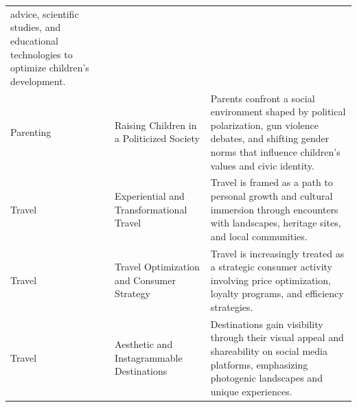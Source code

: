 \documentclass[
  journal=medium,
  manuscript=article-type,
  year=2025,
  volume=1,
]{cup-journal}
\begin{document}
\begin{table}[hbt!]
\begin{threeparttable}
\begin{tabular}{llp{6cm}}
    advice, scientific studies, and educational technologies to optimize children's
    development. \\
Parenting
  & Raising Children in a Politicized Society
  & Parents confront a social environment shaped by political polarization, gun
    violence debates, and shifting gender norms that influence children's values and
    civic identity. \\
\addlinespace
Travel
  & Experiential and Transformational Travel
  & Travel is framed as a path to personal growth and cultural immersion through
    encounters with landscapes, heritage sites, and local communities. \\
Travel
  & Travel Optimization and Consumer Strategy
  & Travel is increasingly treated as a strategic consumer activity involving price
    optimization, loyalty programs, and efficiency strategies. \\
Travel
  & Aesthetic and Instagrammable Destinations
  & Destinations gain visibility through their visual appeal and shareability on social
    media platforms, emphasizing photogenic landscapes and unique experiences. \\
\bottomrule
\end{tabular}
\end{threeparttable}
\end{table}
\end{document}
